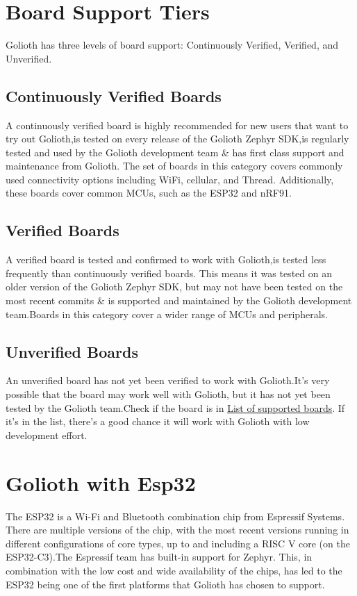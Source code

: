 \documentclass[journal,5pt,twocolumn]{IEEEtran}
\begin{document}
\section{\textbf{Board Support Tiers}}
Golioth has three levels of board support: Continuously Verified, Verified, and Unverified.
\subsection{\textbf{Continuously Verified Boards}}
\raggedright A continuously verified board is highly recommended for new users that want to try out Golioth,is tested on every release of the Golioth Zephyr SDK,is regularly tested and used by the Golioth development team \& has first class support and maintenance from Golioth.
The set of boards in this category covers commonly used connectivity options including WiFi, cellular, and Thread. Additionally, these boards cover common MCUs, such as the ESP32 and nRF91.
\subsection{\textbf{Verified Boards}}
\raggedright A verified board is tested and confirmed to work with Golioth,is tested less frequently than continuously verified boards. 
This means it was tested on an older version of the Golioth Zephyr SDK, but may not have been tested on the most recent commits \& is supported and maintained by the Golioth development team.Boards in this category cover a wider range of MCUs and peripherals.
\subsection{\textbf{Unverified Boards}}
\raggedright An unverified board has not yet been verified to work with Golioth.It's very possible that the board may work well with Golioth, but it has not yet been tested by the Golioth team.Check if the board is in {\href{https://docs.zephyrproject.org/latest/boards/index.html}{List of supported boards}}. If it's in the list, there's a good chance it will work with Golioth with low development effort.
\section{\textbf{Golioth with Esp32}}
\raggedright The ESP32 is a Wi-Fi and Bluetooth combination chip from Espressif Systems. There are multiple versions of the chip, with the most recent versions running in different configurations of core types, up to and including a RISC V core (on the ESP32-C3).The Espressif team has built-in support for Zephyr. This, in combination with the low cost and wide availability of the chips, has led to the ESP32 being one of the first platforms that Golioth has chosen to support.
\end{document}
